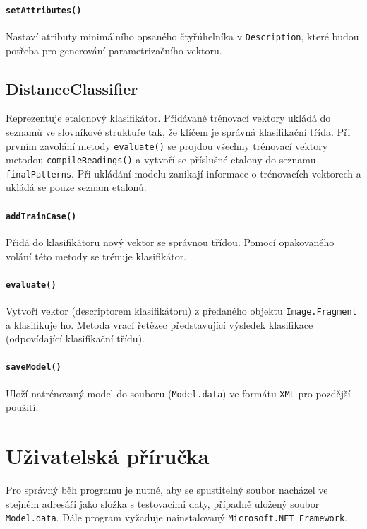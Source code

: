 \documentclass[12pt]{article}
\begin{document}
\paragraph{\texttt{setAttributes()}}
Nastaví atributy minimálního opsaného čtyřúhelníka v \texttt{Description}, které budou potřeba pro generování parametrizačního vektoru.

\subsection{DistanceClassifier}
Reprezentuje etalonový klasifikátor. Přidávané trénovací vektory ukládá do seznamů ve slovníkové struktuře tak, že klíčem je správná klasifikační třída. Při prvním zavolání metody \texttt{evaluate()} se projdou všechny trénovací vektory metodou \texttt{compileReadings()} a vytvoří se příslušné etalony do seznamu \texttt{finalPatterns}. Při ukládání modelu zanikají informace o trénovacích vektorech a ukládá se pouze seznam etalonů.

\paragraph{\texttt{addTrainCase()}}
Přidá do klasifikátoru nový vektor se správnou třídou. Pomocí opakovaného volání této metody se trénuje klasifikátor.

\paragraph{\texttt{evaluate()}}
Vytvoří vektor (descriptorem klasifikátoru) z předaného objektu \texttt{Image.Fragment} a klasifikuje ho. Metoda vrací řetězec představující výsledek klasifikace (odpovídající klasifikační třídu).

\paragraph{\texttt{saveModel()}}
Uloží natrénovaný model do souboru (\texttt{Model.data}) ve formátu \texttt{XML} pro pozdější použití.

\section{Uživatelská příručka}
Pro správný běh programu je nutné, aby se spustitelný soubor nacházel ve stejném adresáři jako složka s testovacími daty, případně uložený soubor \texttt{Model.data}. Dále program vyžaduje nainstalovaný \texttt{Microsoft.NET Framework}.
\end{document}
